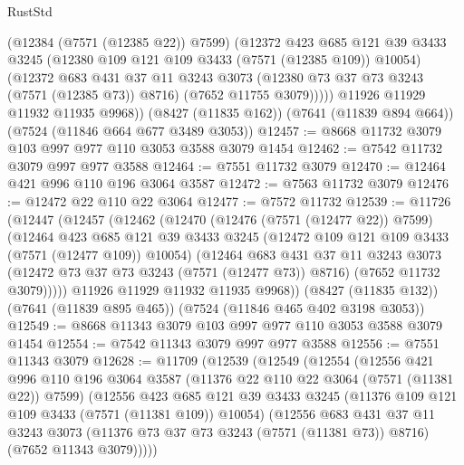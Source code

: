 \begin{lexlean}{RustStd}
\begin{coremodule}
            (@12384 (@7571 (@12385 @22)) @7599)
            (@12372
              @423
              @685
              @121
              @39
              @3433
              @3245
              (@12380 @109 @121 @109 @3433 (@7571 (@12385 @109)) @10054)
              (@12372
                @683
                @431
                @37
                @11
                @3243
                @3073
                (@12380 @73 @37 @73 @3243 (@7571 (@12385 @73)) @8716)
                (@7652 @11755 @3079)))))
        @11926
        @11929
        @11932
        @11935
        @9968))
    (@8427 (@11835 @162))
    (@7641 (@11839 @894 @664))
    (@7524 (@11846 @664 @677 @3489 @3053))
@12457 := @8668 @11732 @3079 @103 @997 @977 @110 @3053 @3588 @3079 @1454
@12462 := @7542 @11732 @3079 @997 @977 @3588
@12464 := @7551 @11732 @3079
@12470 := @12464 @421 @996 @110 @196 @3064 @3587
@12472 := @7563 @11732 @3079
@12476 := @12472 @22 @110 @22 @3064
@12477 := @7572 @11732
@12539 := @11726
    (@12447
      (@12457
        (@12462
          (@12470
            (@12476 (@7571 (@12477 @22)) @7599)
            (@12464
              @423
              @685
              @121
              @39
              @3433
              @3245
              (@12472 @109 @121 @109 @3433 (@7571 (@12477 @109)) @10054)
              (@12464
                @683
                @431
                @37
                @11
                @3243
                @3073
                (@12472 @73 @37 @73 @3243 (@7571 (@12477 @73)) @8716)
                (@7652 @11732 @3079)))))
        @11926
        @11929
        @11932
        @11935
        @9968))
    (@8427 (@11835 @132))
    (@7641 (@11839 @895 @465))
    (@7524 (@11846 @465 @402 @3198 @3053))
@12549 := @8668 @11343 @3079 @103 @997 @977 @110 @3053 @3588 @3079 @1454
@12554 := @7542 @11343 @3079 @997 @977 @3588
@12556 := @7551 @11343 @3079
@12628 := @11709
    (@12539
      (@12549
        (@12554
          (@12556
            @421
            @996
            @110
            @196
            @3064
            @3587
            (@11376 @22 @110 @22 @3064 (@7571 (@11381 @22)) @7599)
            (@12556
              @423
              @685
              @121
              @39
              @3433
              @3245
              (@11376 @109 @121 @109 @3433 (@7571 (@11381 @109)) @10054)
              (@12556
                @683
                @431
                @37
                @11
                @3243
                @3073
                (@11376 @73 @37 @73 @3243 (@7571 (@11381 @73)) @8716)
                (@7652 @11343 @3079)))))

\end{coremodule}
\end{lexlean}
